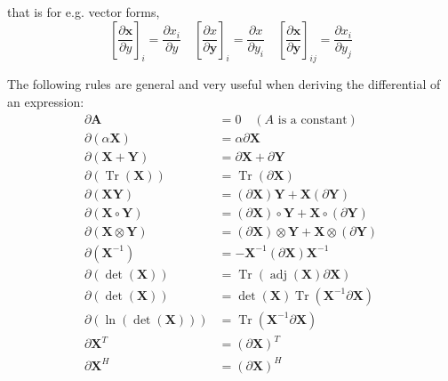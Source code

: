 that is for e.g. vector forms,
\begin{equation}
\left[\frac{\partial \mathbf{x}}{\partial y}\right]_{i}=\frac{\partial x_{i}}{\partial y} \quad\left[\frac{\partial x}{\partial \mathbf{y}}\right]_{i}=\frac{\partial x}{\partial y_{i}} \quad\left[\frac{\partial \mathbf{x}}{\partial \mathbf{y}}\right]_{i j}=\frac{\partial x_{i}}{\partial y_{j}}
\end{equation}

\begin{theorem}
    The following rules are general and very useful when deriving the differential of an expression: 
\begin{equation}
\begin{aligned}
\partial \mathbf{A} &=0 \quad(A\text{ is a constant}) \\
\partial(\alpha \mathbf{X}) &=\alpha \partial \mathbf{X} \\
\partial(\mathbf{X}+\mathbf{Y}) &=\partial \mathbf{X}+\partial \mathbf{Y} \\
\partial(\operatorname{Tr}(\mathbf{X})) &=\operatorname{Tr}(\partial \mathbf{X}) \\
\partial(\mathbf{X Y}) &=(\partial \mathbf{X}) \mathbf{Y}+\mathbf{X}(\partial \mathbf{Y}) \\
\partial(\mathbf{X} \circ \mathbf{Y}) &=(\partial \mathbf{X}) \circ \mathbf{Y}+\mathbf{X} \circ(\partial \mathbf{Y}) \\
\partial(\mathbf{X} \otimes \mathbf{Y}) &=(\partial \mathbf{X}) \otimes \mathbf{Y}+\mathbf{X} \otimes(\partial \mathbf{Y}) \\
\partial\left(\mathbf{X}^{-1}\right) &=-\mathbf{X}^{-1}(\partial \mathbf{X}) \mathbf{X}^{-1} \\
\partial(\operatorname{det}(\mathbf{X})) &=\operatorname{Tr}(\operatorname{adj}(\mathbf{X}) \partial \mathbf{X}) \\
\partial(\operatorname{det}(\mathbf{X})) &=\operatorname{det}(\mathbf{X}) \operatorname{Tr}\left(\mathbf{X}^{-1} \partial \mathbf{X}\right) \\
\partial(\ln (\operatorname{det}(\mathbf{X}))) &=\operatorname{Tr}\left(\mathbf{X}^{-1} \partial \mathbf{X}\right) \\
\partial \mathbf{X}^{T} &=(\partial \mathbf{X})^{T} \\
\partial \mathbf{X}^{H} &=(\partial \mathbf{X})^{H}
\end{aligned}
\end{equation}

\end{theorem}

